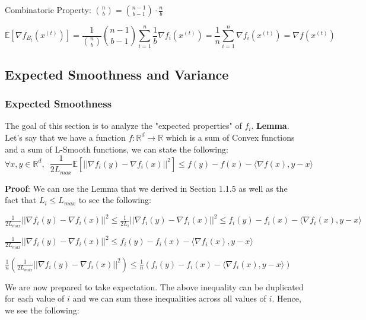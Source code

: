 Combinatoric Property: $\binom{n}{b} = \binom{n - 1}{b - 1} \cdot \frac{n}{b}$

\begin{equation}
    \mathbb{E}[\nabla f_{B_t}(x^{(t)})] = \frac{1}{\binom{n}{b}} \binom{n - 1}{b - 1} \sum_{i = 1}^{n} \frac{1}{b}\nabla f_{i}(x^{(t)}) = \frac{1}{n} \sum_{i = 1}^{n} \nabla f_{i}(x^{(t)}) = \nabla f(x^{(t)})
\end{equation}

\subsection{Expected Smoothness and Variance}
\subsubsection{Expected Smoothness}
The goal of this section is to analyze the "expected properties" of $f_i$. \newline 
\noindent \textbf{Lemma}. Let's say that we have a function $f: \mathbb{R}^d \rightarrow \mathbb{R}$ which is a sum of Convex functions and a sum of L-Smooth functions, we can state the following: 
\begin{equation}
    \forall x, y \in \mathbb{R}^d, \enspace \frac{1}{2L_{max}} \mathbb{E}[||\nabla f_i(y) - \nabla f_i(x)||^2] \leq f(y) - f(x) - \langle \nabla f(x), y - x \rangle
\end{equation}

\noindent \textbf{Proof}: 
We can use the Lemma that we derived in Section 1.1.5 as well as the fact that $L_i \leq L_{max}$ to see the following: \newline 

$\frac{1}{2L_{max}} ||\nabla f_i(y) - \nabla f_i(x)||^2 \leq \frac{1}{2L_i} ||\nabla f_i(y) - \nabla f_i(x)||^2 \leq f_i(y) - f_i(x) - \langle \nabla f_i(x), y - x \rangle$ \newline 

$\frac{1}{2L_{max}} ||\nabla f_i(y) - \nabla f_i(x)||^2 \leq f_i(y) - f_i(x) - \langle \nabla f_i(x), y - x \rangle$ \newline 

$\frac{1}{n} (\frac{1}{2L_{max}} ||\nabla f_i(y) - \nabla f_i(x)||^2) \leq \frac{1}{n} (f_i(y) - f_i(x) - \langle \nabla f_i(x), y - x \rangle)$ \newline 

We are now prepared to take expectation. The above inequality can be duplicated for each value of $i$ and we can sum these inequalities across all values of $i$. Hence, we see the following: \newline 

